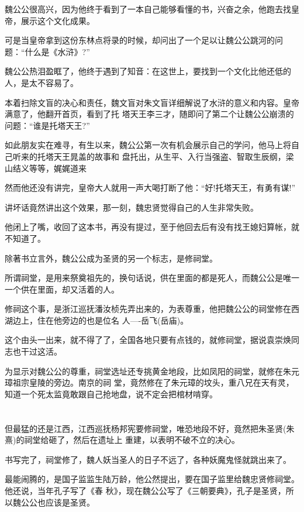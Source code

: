 \documentclass[11pt,a4paper,onecolumn]{article}
\begin{document}
魏公公很高兴，因为他终于看到了一本自己能够看懂的书，兴奋之余，他跑去找皇帝，展示这个文化成果。

可是当皇帝拿到这份东林点将录的时候，却问出了一个足以让魏公公跳河的问题：``什么是《水浒》?''

魏公公热泪盈眶了，他终于遇到了知音：在这世上，要找到一个文化比他还低的人，是太不容易了。

本着扫除文盲的决心和责任，魏文盲对朱文盲详细解说了水浒的意义和内容。皇帝满意了，他翻开首页，看到了托
塔天王李三才，随即问了第二个让魏公公崩溃的问题：``谁是托塔天王?''

如此朋友实在难寻，有生以来，魏公公第一次有机会展示自己的学问，他马上将自己听来的托塔天王晁盖的故事和
盘托出，从生平、入行当强盗、智取生辰纲，梁山结义等等，娓娓道来

然而他还没有讲完，皇帝大人就用一声大喝打断了他：``好!托塔天王，有勇有谋!''

讲坏话竟然讲出这个效果，那一刻，魏忠贤觉得自己的人生非常失败。

他闭上了嘴，收回了这本书，再没有提过，至于他回去后有没有找王媳妇算帐，就不知道了。

除著书立言外，魏公公成为圣贤的另一个标志，是修祠堂。

所谓祠堂，是用来祭奠祖先的，换句话说，供在里面的都是死人，而魏公公是唯一一个供在里面，却又活着的人。

修祠这个事，是浙江巡抚潘汝桢先弄出来的，为表尊重，他把魏公公的祠堂修在西湖边上，住在他旁边的也是位名
人----岳飞(岳庙)。

这个由头一出来，就不得了了，全国各地只要有点钱的，就修祠堂，据说袁崇焕同志也干过这活。

为显示对魏公公的尊重，祠堂选址还专挑黄金地段，比如凤阳的祠堂，就修在朱元璋祖宗皇陵的旁边。南京的祠
堂，竟然修在了朱元璋的坟头，重八兄在天有灵，知道一个死太监竟敢跟自己抢地盘，说不定会把棺材啃穿。

\section[\thesection]{}

但最猛的还是江西，江西巡抚杨邦宪要修祠堂，唯恐地段不好，竟然把朱圣贤(朱熹)的祠堂给砸了，然后在遗址上
重建，以表明不破不立的决心。

书写完了，祠堂修了，魏人妖当圣人的日子不远了，各种妖魔鬼怪就跳出来了。

最能闹腾的，是国子监监生陆万龄，他公然提出，要在国子监里给魏忠贤修祠堂。他还说，当年孔子写了《春
秋》，现在魏公公写了《三朝要典》，孔子是圣贤，所以魏公公也应该是圣贤。
\end{document}
